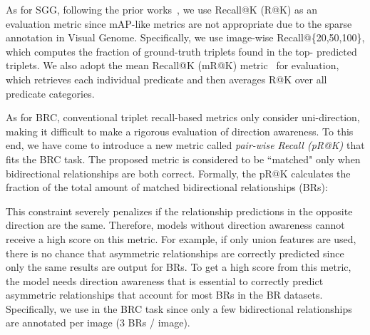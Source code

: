             As for SGG, following the prior works~\cite{xu2017scene, zellers2018neural, yang2018graph}, we use Recall@K (R@K) as an evaluation metric since mAP-like metrics are not appropriate due to the sparse annotation in Visual Genome. Specifically, we use image-wise Recall@\{20,50,100\}, which computes the fraction of ground-truth triplets found in the top- predicted triplets.
            We also adopt the mean Recall@K (mR@K) metric~\cite{tang2019learning, chen2019knowledge, tang2020unbiased} for evaluation, which retrieves each individual predicate and then averages R@K over all predicate categories.
            
            As for BRC, conventional triplet recall-based metrics only consider uni-direction, making it difficult to make a rigorous evaluation of direction awareness. To this end, we have come to introduce a new metric called \textit{pair-wise Recall (pR@K)} that fits the BRC task. The proposed metric is considered to be ``matched" only when bidirectional relationships are both correct. Formally, the pR@K calculates the fraction of the total amount of matched bidirectional relationships (BRs):
            
            This constraint severely penalizes if the relationship predictions in the opposite direction are the same. Therefore, models without direction awareness cannot receive a high score on this metric.
            For example, if only union features are used, there is no chance that asymmetric relationships are correctly predicted since only the same results are output for BRs.
            To get a high score from this metric, the model needs direction awareness that is essential to correctly predict asymmetric relationships that account for most BRs in the BR datasets.
            Specifically, we use  in the BRC task since only a few bidirectional relationships are annotated per image (3 BRs / image).
            
